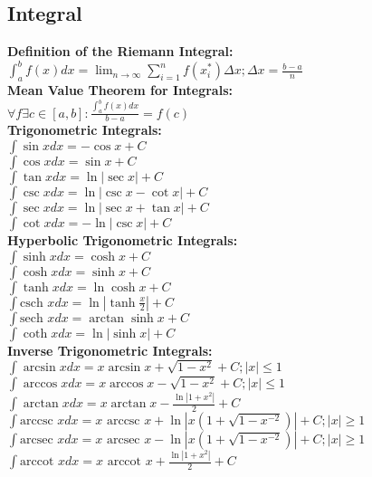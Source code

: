 \documentclass[12pt]{article}
\begin{document}
\subsection*{Integral}
\textbf{Definition of the Riemann Integral:}
    \\ \( \displaystyle\int_{a}^{b} { f( x ) dx } = \displaystyle\lim_{n \rightarrow{\infty}} \displaystyle\sum_{i = 1}^{n} { f( x_{i}^{*} ) \Delta x ; \Delta x = \displaystyle\frac{ b - a }{ n } } \)
\\ \textbf{Mean Value Theorem for Integrals:}
    \\ \( \forall f \exists c \in [a, b] : \displaystyle\frac{ \displaystyle\int_{a}^{b} { f( x ) dx } }{ b - a } = f( c ) \)
\\ \textbf{Trigonometric Integrals:}
    \\ \( \displaystyle\int { \sin x dx } = - \cos x + C \)
    \\ \( \displaystyle\int { \cos x dx } = \sin x + C \)
    \\ \( \displaystyle\int { \tan x dx } = \ln| \sec x | + C \)
    \\ \( \displaystyle\int { \csc x dx } = \ln| \csc x - \cot x | + C \)
    \\ \( \displaystyle\int { \sec x dx } = \ln| \sec x + \tan x | + C \)
    \\ \( \displaystyle\int { \cot x dx } = - \ln| \csc x | + C \)
\\ \textbf{Hyperbolic Trigonometric Integrals:}
    \\ \( \displaystyle\int { \sinh x dx } = \cosh x + C \)
    \\ \( \displaystyle\int { \cosh x dx } = \sinh x + C \)
    \\ \( \displaystyle\int { \tanh x dx } = \ln \cosh x + C \)
    \\ \( \displaystyle\int { \text{csch } x dx } = \ln \left| \tanh \displaystyle\frac{ x }{ 2 } \right| + C \)
    \\ \( \displaystyle\int { \text{sech } x dx } = \arctan \sinh x + C \)
    \\ \( \displaystyle\int { \coth x dx } = \ln| \sinh x | + C \)
\\ \textbf{Inverse Trigonometric Integrals: }
    \\ \( \displaystyle\int { \arcsin x dx } = x \arcsin x + \sqrt{ 1 - x^2 } + C ; | x | \le 1 \)
    \\ \( \displaystyle\int { \arccos x dx } = x \arccos x - \sqrt{ 1 - x^2 } + C ; | x | \le 1 \)
    \\ \( \displaystyle\int { \arctan x dx } = x \arctan x - \displaystyle\frac{ \ln| 1 + x^2 | }{ 2 } + C \)
    \\ \( \displaystyle\int { \text{arccsc } x dx } = x \text{ arccsc } x + \ln \left| x \left( 1 + \sqrt{ 1 - x^{-2} } \right) \right| + C ; | x | \ge 1 \)
    \\ \( \displaystyle\int { \text{arcsec } x dx } = x \text{ arcsec } x - \ln \left| x \left( 1 + \sqrt{ 1 - x^{-2} } \right) \right| + C ; | x | \ge 1 \)
    \\ \( \displaystyle\int { \text{arccot } x dx } = x \text{ arccot } x + \displaystyle\frac{ \ln| 1 + x^2 | }{ 2 } + C \)
\end{document}
